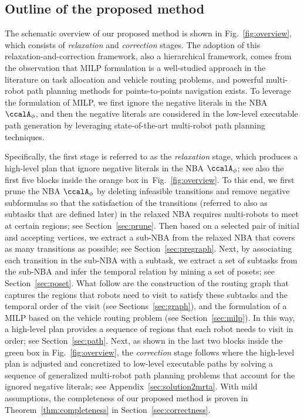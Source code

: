 \documentclass[Afour,sageh,times]{sagej}
\newcommand{\autop}{\ccalA_{\phi}}
\begin{document}
\subsection{Outline of the proposed method}
           { The schematic overview of our proposed method is shown in Fig.~\ref{fig:overview}, which consists of {\it relaxation} and {\it correction} stages.  The adoption of this relaxation-and-correction framework, also a hierarchical framework, comes from the observation that MILP formulation is a well-studied approach in the literature on task allocation and vehicle routing problems, and powerful multi-robot path planning methods for points-to-points navigation exists. To leverage the formulation of MILP, we first ignore the negative literals in the NBA $\autop$, %
         and then  the negative literals are  considered in the low-level executable path generation by leveraging state-of-the-art multi-robot path planning techniques.

         Specifically, the first stage is referred to as the {\it relaxation} stage, which produces a high-level plan that ignore  negative literals  in the NBA $\autop$; see also the first five blocks inside the orange box in~Fig.~\ref{fig:overview}. To this end, we first prune the NBA $\autop$ by deleting infeasible transitions and remove negative subformulas  so that the satisfaction of the transitions (referred to also as subtasks that are defined later) in the relaxed NBA requires multi-robots to meet at certain regions; see Section~\ref{sec:prune}. Then based on  a selected pair of initial and accepting vertices, we extract a sub-NBA  from the relaxed NBA that covers as many transitions as possible; see Section~\ref{sec:pregraph}. Next, by associating each transition in the sub-NBA with a subtask, we extract a set of subtasks from the sub-NBA and infer the temporal relation by mining a set of posets; see Section~\ref{sec:poset}. What follow are the construction of the routing graph that captures the regions that robots need to visit to satisfy these subtasks and the temporal order of the visit (see Sections~\ref{sec:graph}), and the formulation of a MILP based on the vehicle routing problem (see Section~\ref{sec:milp}). In this way, a high-level plan provides a sequence of regions that each robot needs to visit in order; see Section~\ref{sec:path}. Next, as shown in the last two blocks inside the green box in Fig.~\ref{fig:overview}, the {\it correction} stage follows where the high-level plan is adjusted and concretized to low-level executable paths by solving a sequence of generalized multi-robot path planning problems that account for the ignored negative literals; see Appendix~\ref{sec:solution2mrta}. With mild assumptions, the completeness of our proposed method is proven in Theorem~\ref{thm:completeness} in Section~\ref{sec:correctness}.

}
\end{document}
